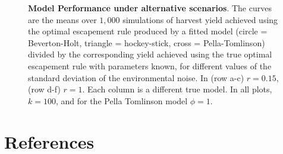 \documentclass[]{elsarticle} %
\begin{document}
\begin{figure}[tb]
\begin{subfigure}[t]{0.3\textwidth}
	\end{subfigure}
	\caption{\textbf{Model Performance under alternative scenarios}. The curves are the means over $1,000$ simulations of harvest yield achieved using the optimal escapement rule produced by a fitted model (circle = Beverton-Holt, triangle = hockey-stick, cross = Pella-Tomlinson) divided by the corresponding yield achieved using the true optimal escapement rule with parameters known, for different values of the standard deviation of the environmental noise. In (row a-c) $r=0.15$, (row d-f) $r=1$. Each column is a different true model. In all plots, $k=100$, and for the Pella Tomlinson model $\phi = 1$.}\label{fig:ModelPerfVSig}
\end{figure}


\section*{References}\label{references}



\hypertarget{refs}{}
\end{document}
